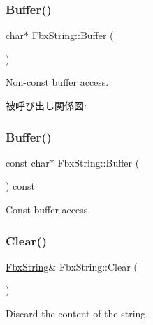 \subsubsection{\texorpdfstring{Buffer()}{Buffer()}\hspace{0.1cm}{\footnotesize\ttfamily [1/2]}}
{\footnotesize\ttfamily char$\ast$ Fbx\+String\+::\+Buffer (\begin{DoxyParamCaption}{ }\end{DoxyParamCaption})}



Non-\/const buffer access. 

被呼び出し関係図\+:
\mbox{\label{class_fbx_string_af23b5752c4eb99775b7cdca217e884fc}} 
\subsubsection{\texorpdfstring{Buffer()}{Buffer()}\hspace{0.1cm}{\footnotesize\ttfamily [2/2]}}
{\footnotesize\ttfamily const char$\ast$ Fbx\+String\+::\+Buffer (\begin{DoxyParamCaption}{ }\end{DoxyParamCaption}) const}



Const buffer access. 

\mbox{\label{class_fbx_string_a8adc4e498591b2ed324da12db298cede}} 
\subsubsection{\texorpdfstring{Clear()}{Clear()}}
{\footnotesize\ttfamily \hyperlink{class_fbx_string}{Fbx\+String}\& Fbx\+String\+::\+Clear (\begin{DoxyParamCaption}{ }\end{DoxyParamCaption})}



Discard the content of the string. 

\mbox{\label{class_fbx_string_a42ed521019bea60f8bc77079c41adc06}} 
